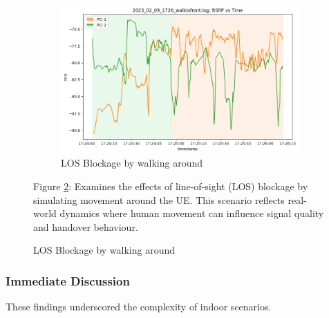 \begin{figure}[p]
    \vspace{1cm}
    \begin{minipage}{0.45\textwidth}
    \begin{subfigure}{\linewidth}
        \centering
        \includegraphics[width=0.9\linewidth]{src//img/2024_02_09_los_block.png}
        \caption{LOS Blockage by walking around}
        \label{fig:real:mobile:block}
    \end{subfigure}
    \end{minipage}
    \begin{minipage}{0.45\textwidth}
        \small{Figure \ref{fig:real:mobile:block}: Examines the effects of line-of-sight (LOS) blockage by simulating movement around the UE. This scenario reflects real-world dynamics where human movement can influence signal quality and handover behaviour.}
    \end{minipage}
\end{figure}
\subsubsection{Immediate Discussion}
These findings underscored the complexity of indoor scenarios.

